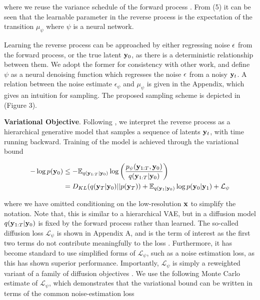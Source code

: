 \documentclass{article}
\begin{document}
where we reuse the variance schedule of the forward process \citep{Ho2020}. From (5) it can be seen that the learnable parameter in the reverse process is the expectation of the transition $\mu_{\psi}$ where $\psi$ is a neural network. 

Learning the reverse process can be approached by either regressing noise $\bold{\epsilon}$ from the forward process, or the true latent $\bold{y}_{0}$, as there is a deterministic relationship between them. We adopt the former for consistency with other work, and define $\psi$ as a neural denoising function which regresses the noise $\bold{\epsilon}$ from a noisy $\bold{y}_{t}$. A relation between the noise estimate $\epsilon_{\psi}$ and $\mu_{\psi}$ is given in the Appendix, which gives an intuition for sampling. The proposed sampling scheme is depicted in (Figure 3). 

\textbf{Variational Objective}. Following \citep{Kingma2021}, we interpret the reverse process as a hierarchical generative model that samples a sequence of latents $\bold{y}_{t}$, with time running backward. Training of the model is achieved through the variational bound

\begin{align}
-\log p(\bold{y}_{0}) &\leq -\mathbb{E}_{q(\bold{y}_{1:T}|\bold{y}_{0})} \log \left(\frac{p_{\psi}(\bold{y}_{1:T},\bold{y}_{0})}{q(\bold{y}_{1:T}|\bold{y}_{0})}\right) \\
&=  D_{KL}(q(\bold{y}_{T}|\bold{y}_{0}) || p(\bold{y}_{T})) + \mathbb{E}_{q(\bold{y}_{1}|\bold{y}_{0})} \log p(\bold{y}_{0}|\bold{y}_{1}) + \mathcal{L}_{\psi}
\end{align}

where we have omitted conditioning on the low-resolution $\bold{x}$ to simplify the notation. Note that, this is similar to a hierarchical VAE, but in a diffusion model $q(\bold{y}_{1:T}|\bold{y}_{0})$ is fixed by the forward process rather than learned. The so-called diffusion loss $\mathcal{L}_{\psi}$ is shown in Appendix A, and is the term of interest as the first two terms do not contribute meaningfully to the loss \citep{Ho2020}. Furthermore, it has become standard to use simplified forms of $\mathcal{L}_{\psi}$, such as a noise estimation loss, as this has shown superior performance. Importantly, $\mathcal{L}_{\psi}$ is simply a reweighted variant of a family of diffusion objectives \citep{Kingma2021,Kingma2023}. We use the following Monte Carlo estimate of $\mathcal{L}_{\psi}$, which demonstrates that the variational bound can be written in terms of the common noise-estimation loss
\end{document}
